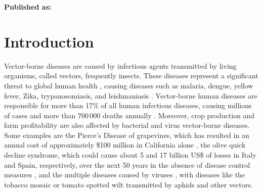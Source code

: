 





\textbf{Published as:}

\vspace{0.5cm}


\newpage
\section{Introduction}\label{sec:intro}

Vector-borne diseases are caused by infectious agents transmitted by living
organisms, called vectors,  frequently insects. These diseases represent a
significant threat to global human health \cite{Athni_2020}, causing diseases
such as malaria, dengue, yellow fever, Zika, trypanosomiasis, and leishmaniasis
\cite{SCHUMACHER2018352}. Vector-borne human diseases are responsible for more
than 17\% of all human infectious diseases, causing millions of cases and more
than $700\,000$ deaths annually \cite{WHO}. Moreover, crop production and farm
profitability are also affected by bacterial \cite{HUANG20201379} and virus
\cite{Bragard2013} vector-borne diseases. Some examples are the Pierce's
Disease of grapevines, which has resulted in an annual cost of approximately
\$100 million in California alone \cite{Tumber2014}, the olive quick
decline syndrome, which could cause about 5 and 17 billion US\$ of losses in
Italy and Spain, respectively, over the next 50 years in the absence of disease
control measures \cite{Schneider2020}, and the multiple diseases caused by
viruses \cite{Rybicki2015}, with diseases like the tobacco mosaic or tomato
spotted wilt transmitted by aphids and other vectors.

